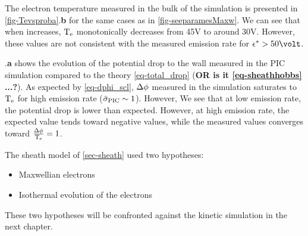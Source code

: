   The electron temperature measured in the bulk of the simulation is presented in \cref{fig-Tevsproba}.{\bf b} for the same cases as in \cref{fig-seeparamesMaxw}.
  We can see that when \rate increases, $\mathrm{T_e}$ monotonically decreases from 45V to around 30V.
  However, these values are not consistent with the measured emission rate \ratepic for $\crover > 50\volt$.

  .{\bf a} shows the evolution of the potential drop to the wall measured in the \ac{PIC} simulation compared to the theory \vref{eq-total_drop} ({\bf OR is it \cref{eq-sheathhobbs} ...?}).
  As expected by \vref{eq-dphi_scl}, $\Delta \phi$ measured in the simulation saturates to $\mathrm{T_e}$ for high emission rate ($ \bar{\sigma }_{\rm PIC} \sim 1$).
  However, 
  We see that at low emission rate, the potential drop is lower than expected.
  However, at high emission rate, the expected value tends toward negative values, while the measured values converges toward $\frac{\Delta \phi}{\mathrm{T_e}} = 1$.
  
  The sheath model of \cref{sec-sheath} used two hypotheses:
  \begin{itemize}
    \item Maxwellian electrons
    \item Isothermal evolution of the electrons
  \end{itemize}
  These two hypotheses will be confronted against the kinetic simulation in the next chapter.
  
  
   